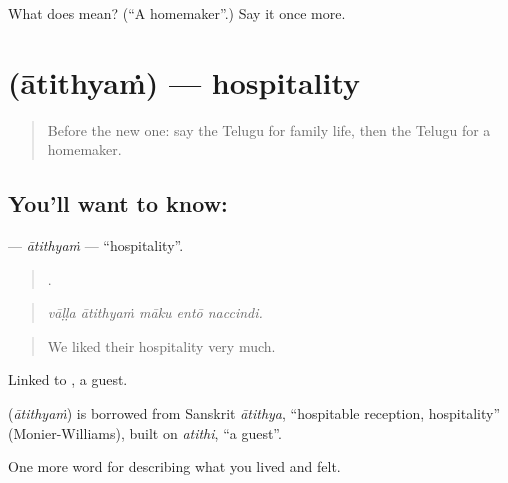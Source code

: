 \begin{tcolorbox}[breakable,colback=teal!4,colframe=teal!35!black,title={Before you move on}]
What does  mean? (\textquotedblleft{}A homemaker\textquotedblright{}.) Say it once more.
\end{tcolorbox}
\section[\texorpdfstring{\te{ఆతిథ్యం} (ātithyaṁ)}{ఆతిథ్యం (ātithyaṁ)}]{ (ātithyaṁ) — hospitality}

\label{lesson:TE-C533-atithyam}



\begin{quote}
Before the new one: say the Telugu for family life, then the Telugu for a homemaker.
\end{quote}

\subsection*{You'll want to know: }
\textbf{} — \emph{ātithyaṁ} — \textquotedblleft{}hospitality\textquotedblright{}.

\begin{quote}
    .
\end{quote}

\begin{quote}
\emph{vāḷḷa ātithyaṁ māku entō naccindi.}
\end{quote}

\begin{quote}
We liked their hospitality very much.
\end{quote}

Linked to , a guest.

\begin{cousinweb}
\textbf{} (\emph{ātithyaṁ}) is borrowed from Sanskrit \emph{ātithya}, \textquotedblleft{}hospitable reception, hospitality\textquotedblright{} (Monier-Williams), built on \emph{atithi}, \textquotedblleft{}a guest\textquotedblright{}.
\end{cousinweb}

\begin{grammarlens}[title={What you've built}]
One more word for describing what you lived and felt.
\end{grammarlens}

